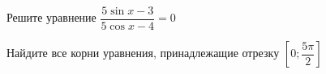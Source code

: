 \begin{ex}
	\begin{condition}
		\begin{enumcols}[label=\asbuk*)]
			\item Решите уравнение \( \dfrac{5\sin x - 3}{5\cos x -4} = 0 \)
			\item Найдите все корни уравнения, принадлежащие отрезку \( \left[0;\dfrac{5\pi}{2}\right] \)
		\end{enumcols}
	\end{condition}
\end{ex}